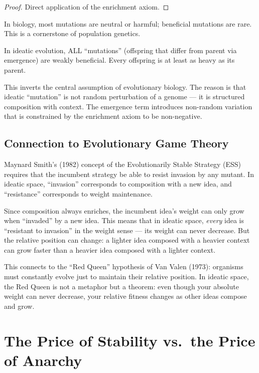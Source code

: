 \begin{proof}
Direct application of the enrichment axiom.
\end{proof}

\begin{paradox}
In biology, most mutations are neutral or harmful; beneficial mutations are rare. This is a cornerstone of population genetics.

In ideatic evolution, ALL ``mutations'' (offspring that differ from parent via emergence) are weakly beneficial. Every offspring is at least as heavy as its parent.

This inverts the central assumption of evolutionary biology. The reason is that ideatic ``mutation'' is not random perturbation of a genome --- it is structured composition with context. The emergence term introduces non-random variation that is constrained by the enrichment axiom to be non-negative.
\end{paradox}

\section{Connection to Evolutionary Game Theory}

Maynard Smith's (1982) concept of the Evolutionarily Stable Strategy (ESS) requires that the incumbent strategy be able to resist invasion by any mutant. In ideatic space, ``invasion'' corresponds to composition with a new idea, and ``resistance'' corresponds to weight maintenance.

Since composition always enriches, the incumbent idea's weight can only grow when ``invaded'' by a new idea. This means that in ideatic space, \emph{every} idea is ``resistant to invasion'' in the weight sense --- its weight can never decrease. But the relative position can change: a lighter idea composed with a heavier context can grow faster than a heavier idea composed with a lighter context.

This connects to the ``Red Queen'' hypothesis of Van Valen (1973): organisms must constantly evolve just to maintain their relative position. In ideatic space, the Red Queen is not a metaphor but a theorem: even though your absolute weight can never decrease, your relative fitness changes as other ideas compose and grow.


\chapter{The Price of Stability vs.\ the Price of Anarchy}

